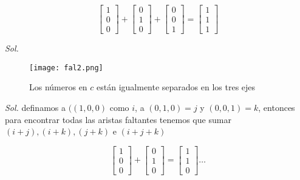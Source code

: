\begin{problem}[¿Qué punto del cubo es $i + j$? ¿Qué punto es la suma vectorial de $i = (1, 0, 0)$
y $j = (0,1,0)$ y $k = (0,0, I)$? Describe todos los puntos $(x, y, z)$ del cubo.]
\begin{equation*}
	\begin{bmatrix} 1\\ 0\\ 0 \end{bmatrix} + \begin{bmatrix} 0\\ 1\\ 0 \end{bmatrix} + \begin{bmatrix} 0\\ 0\\ 1 \end{bmatrix} = \begin{bmatrix} 1\\ 1\\ 1 \end{bmatrix}
\end{equation*}
\end{problem}

\textit{ Sol. }
\begin{figure}[h!]
	\centerline{\texttt{[image: fal2.png]}}
	\caption{Los números en $c$ están igualmente separados en los tres ejes}
	\label{fal2}
\end{figure}

\begin{problem}
\end{problem}

\textit{ Sol. }
definamos a $((1,0,0)$ como $i$, a $(0, 1,0)=j$ y $(0,0,1)=k$, entonces para encontrar todas las aristas faltantes tenemos que sumar $(i+j),(i+k),(j+k)$ e $(i+j+k)$

\begin{equation*}
	\begin{bmatrix} 1\\ 0\\ 0 \end{bmatrix} + \begin{bmatrix} 0\\ 1\\ 0 \end{bmatrix} = \begin{bmatrix} 1\\ 1\\ 0 \end{bmatrix}\ldots
\end{equation*}

